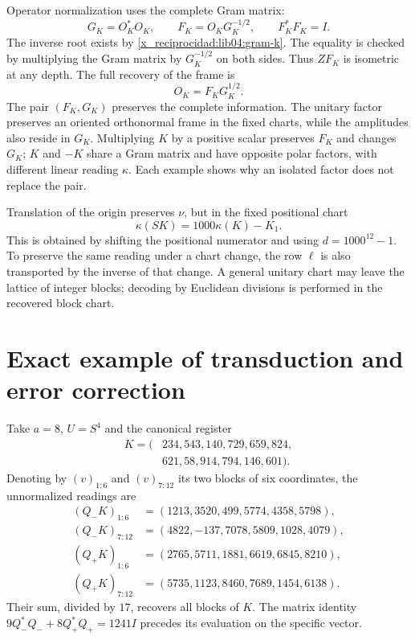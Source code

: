 Operator normalization uses the complete Gram matrix:
\begin{equation}
 G_K=O_K^*O_K,\qquad
 F_K=O_KG_K^{-1/2},\qquad
 F_K^*F_K=I.
 \label{x_reciprocidad:lib04:polar}
\end{equation}
The inverse root exists by \eqref{x_reciprocidad:lib04:gram-k}. The equality is
checked by multiplying the Gram matrix by \(G_K^{-1/2}\) on both sides.
Thus \(ZF_K\) is isometric at any depth.
The full recovery of the frame is
\begin{equation}
 O_K=F_KG_K^{1/2}.
 \label{x_reciprocidad:lib04:polar-inversa}
\end{equation}
The pair \((F_K,G_K)\) preserves the complete information.
The unitary factor preserves an oriented orthonormal frame in the
fixed charts, while the amplitudes also reside in
\(G_K\). Multiplying \(K\) by a positive scalar preserves
\(F_K\) and changes \(G_K\); \(K\) and \(-K\) share a
Gram matrix and have opposite polar factors, with different linear reading
\(\kappa\). Each example shows why an isolated factor does not
replace the pair.

Translation of the origin preserves \(\nu\), but in the fixed positional
chart
\begin{equation}
 \kappa(SK)=1000\kappa(K)-K_1.
 \label{x_reciprocidad:lib04:cambio-origen}
\end{equation}
This is obtained by shifting the positional numerator and using
\(d=1000^{12}-1\). To preserve the same reading under a chart
change, the row \(\ell\) is also transported by the inverse
of that change. A general unitary chart may leave the lattice of
integer blocks; decoding by Euclidean divisions is performed
in the recovered block chart.

\section{Exact example of transduction and error correction}
\label{x_reciprocidad:lib04:ejemplo}

Take \(a=8\), \(U=S^4\) and the canonical register
\begin{equation}
 \begin{split}
 K=(&234,543,140,729,659,824,\\
    &621,58,914,794,146,601).
 \end{split}
 \label{x_reciprocidad:lib04:k-ejemplo}
\end{equation}
Denoting by \((v)_{1:6}\) and \((v)_{7:12}\) its two blocks of
six coordinates, the unnormalized readings are
\begin{align}
 (Q_-K)_{1:6}&=(1213,3520,499,5774,4358,5798),\nonumber\\
 (Q_-K)_{7:12}&=(4822,-137,7078,5809,1028,4079),\nonumber\\
 (Q_+K)_{1:6}&=(2765,5711,1881,6619,6845,8210),\nonumber\\
 (Q_+K)_{7:12}&=(5735,1123,8460,7689,1454,6138).
 \label{x_reciprocidad:lib04:canales-ejemplo}
\end{align}
Their sum, divided by \(17\), recovers all blocks of \(K\).
The matrix identity
\(9Q_-^*Q_-+8Q_+^*Q_+=1241I\) precedes its evaluation on the
specific vector.

